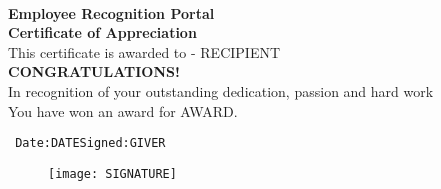 \documentclass[a4]{article}
\begin{document}
    \pagestyle{empty}
    
    \begin{title} \\
    \begin{center}
    \textbf{{\normalsize \color{orange} Employee Recognition Portal}}\\
    \vspace{2em}
    \textbf{{\Large Certificate of Appreciation}}\\
    \vspace{2em}
    This certificate is awarded to - RECIPIENT\\
    \vspace{2em}
    \textbf{{\normalsize \color{red} CONGRATULATIONS!}}\\
    \color{black}In recognition of your outstanding dedication, passion and hard work\\
    You have won an award for \color{blue} AWARD.\\
    
    
    
    
    \end{center}
    \vspace{15em}
    
    \texttt{\noindent
    Date:DATE\hspace{35ex}Signed:GIVER}
    \end{title}
    \begin{figure}[h!]
        \begin{flushright}
            \texttt{[image: SIGNATURE]}
        \end{flushright}
    \end{figure}
\end{document}
